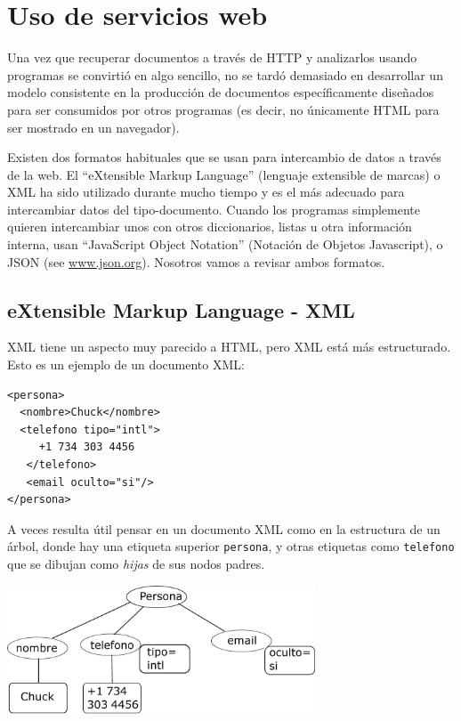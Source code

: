 
\chapter{Uso de servicios web}

Una vez que recuperar documentos a través de HTTP y analizarlos usando
programas se convirtió en algo sencillo,
no se tardó demasiado en desarrollar un modelo
consistente en la producción de
documentos específicamente diseñados para ser consumidos por otros
programas (es decir, no únicamente HTML para ser mostrado en un navegador).

Existen dos formatos habituales que se usan para intercambio de datos a través de la web.
El ``eXtensible Markup Language'' (lenguaje extensible de marcas) o XML ha sido utilizado
durante mucho tiempo y es el más adecuado para intercambiar datos del tipo-documento.
Cuando los programas simplemente quieren intercambiar unos con otros diccionarios, listas u otra
información interna, usan ``JavaScript Object Notation'' (Notación de Objetos Javascript), o JSON
(see \url{www.json.org}). Nosotros vamos a revisar ambos formatos.

\section{eXtensible Markup Language - XML}

XML tiene un aspecto muy parecido a HTML, pero XML está más estructurado.
Esto es un ejemplo de un documento XML:

\beforeverb
\begin{verbatim}
<persona>
  <nombre>Chuck</nombre>
  <telefono tipo="intl">
     +1 734 303 4456
   </telefono>
   <email oculto="si"/>
</persona>
\end{verbatim}
\afterverb
%
A veces resulta útil pensar en un documento XML como en la estructura de un árbol,
donde hay una etiqueta superior {\tt persona}, y otras etiquetas como {\tt telefono}
que se dibujan como \emph{hijas} de sus nodos padres.

\beforefig
\centerline{\includegraphics[height=1.50in]{figs2/xml-tree.eps}}
\afterfig

